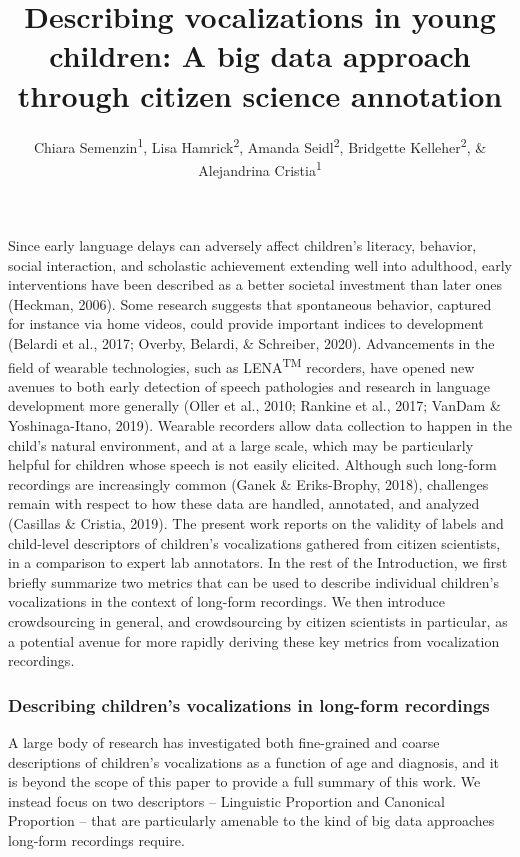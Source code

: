 \documentclass[english,,man,floatsintext]{apa6}
\author{Chiara Semenzin\textsuperscript{1}, Lisa Hamrick\textsuperscript{2}, Amanda Seidl\textsuperscript{2}, Bridgette Kelleher\textsuperscript{2}, \& Alejandrina Cristia\textsuperscript{1}}
\affiliation{
\vspace{0.5cm}
\textsuperscript{1} Laboratoire de Sciences Cognitives et de Psycholinguistique, Département d'Etudes cognitives, ENS, EHESS, CNRS, PSL University\\\textsuperscript{2} Purdue University}
\title{Describing vocalizations in young children: A big data approach through citizen science annotation}
\date{}
\begin{document}
\maketitle

Since early language delays can adversely affect children's literacy, behavior, social interaction, and scholastic achievement extending well into adulthood, early interventions have been described as a better societal investment than later ones (Heckman, 2006). Some research suggests that spontaneous behavior, captured for instance via home videos, could provide important indices to development (Belardi et al., 2017; Overby, Belardi, \& Schreiber, 2020). Advancements in the field of wearable technologies, such as LENA\textsuperscript{TM} recorders, have opened new avenues to both early detection of speech pathologies and research in language development more generally (Oller et al., 2010; Rankine et al., 2017; VanDam \& Yoshinaga-Itano, 2019). Wearable recorders allow data collection to happen in the child's natural environment, and at a large scale, which may be particularly helpful for children whose speech is not easily elicited. Although such long-form recordings are increasingly common (Ganek \& Eriks-Brophy, 2018), challenges remain with respect to how these data are handled, annotated, and analyzed (Casillas \& Cristia, 2019). The present work reports on the validity of labels and child-level descriptors of children's vocalizations gathered from citizen scientists, in a comparison to expert lab annotators. In the rest of the Introduction, we first briefly summarize two metrics that can be used to describe individual children's vocalizations in the context of long-form recordings. We then introduce crowdsourcing in general, and crowdsourcing by citizen scientists in particular, as a potential avenue for more rapidly deriving these key metrics from vocalization recordings.

\hypertarget{describing-childrens-vocalizations-in-long-form-recordings}{%
\subsubsection{Describing children's vocalizations in long-form recordings}\label{describing-childrens-vocalizations-in-long-form-recordings}}

A large body of research has investigated both fine-grained and coarse descriptions of children's vocalizations as a function of age and diagnosis, and it is beyond the scope of this paper to provide a full summary of this work. We instead focus on two descriptors -- Linguistic Proportion and Canonical Proportion -- that are particularly amenable to the kind of big data approaches long-form recordings require.
\end{document}
